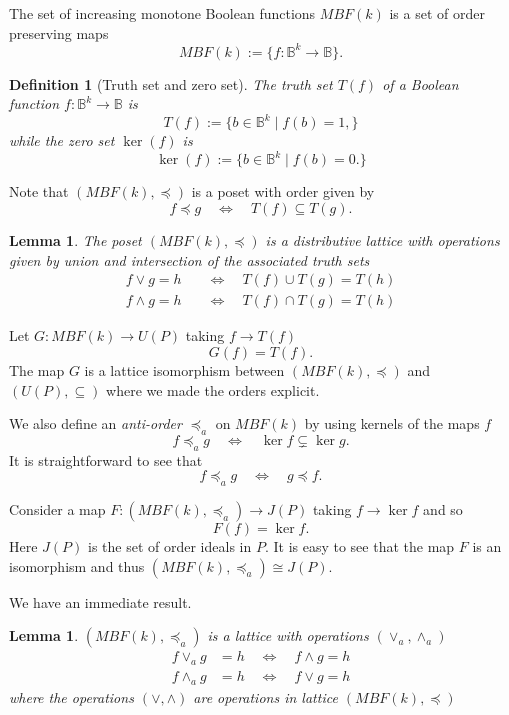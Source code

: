 \documentclass[10pt,letterpaper]{article}
\newcommand{\bbB}{\mathbb{B}}
\newtheorem{lem}[thm]{Lemma}
\newtheorem{defn}[thm]{Definition}
\begin{document}
The set of increasing monotone Boolean functions $MBF(k)$ %
is a set of order preserving maps 
\[ MBF(k):=\{ f:\bbB^k\to \bbB\}. \]


\begin{defn}[Truth set and zero set]
    The \textit{ truth set } $T(f)$ of a Boolean function $f: \bbB^k \to \bbB$ is 
    \[ T(f):=\{ b\in \bbB^k \;|\; f(b) = 1, \}\]
    while the \textit{ zero set } $\ker (f)$ is 
    \[ \ker(f):=\{ b\in \bbB^k \;|\; f(b) = 0. \}\]
\end{defn}

Note that 
$(MBF(k), \preceq)$ is a poset with order given by 
\[ f \preceq g \quad \Leftrightarrow \quad T(f) \subseteq T(g). \]

 \begin{lem}
    The poset $(MBF(k),\preceq)$ is a distributive lattice with operations given by union and intersection of the associated truth sets
    \begin{align*}
         f\vee g = h &\quad \Longleftrightarrow \quad T(f) \cup T(g) = T(h) \\
         f\wedge g = h &\quad \Longleftrightarrow \quad T(f) \cap T(g) = T(h) 
    \end{align*}
 \end{lem}

 Let $G:MBF(k) \to U(P)$ taking $f \to T(f)$
 \[ G(f) = T(f).\]
The map $G$ is a lattice isomorphism between $(MBF(k), \preceq)$ and $(U(P), \subseteq)$ where we made the orders explicit.

We also define an \textit{ anti-order $\preceq_a$} on $MBF(k) $ by using kernels of the maps $f$
\[ f \preceq_a g \quad \Leftrightarrow \quad \ker f \subsetneq \ker g. \]
It is straightforward to see that 
\[ f\preceq_a g \quad \Leftrightarrow \quad g \preceq f.\]

Consider a map $F: (MBF(k),\preceq_a) \to J(P)$ taking $f\to \ker f$ and so 
\[ F(f) = \ker f.\]
Here $J(P)$ is the set of order ideals in $P$. It is easy to see that the map $F$ is an isomorphism and thus $(MBF(k),\preceq_a) \cong J(P)$.

We have an immediate result.
\begin{lem}\label{anti}
    $(MBF(k),\preceq_a)$ is a lattice with operations $(\vee_a, \wedge_a)$
    \begin{align*}
        f \vee_a g &=h \quad \Leftrightarrow \quad f \wedge g =h\\
        f \wedge_a g &=h \quad \Leftrightarrow \quad f \vee g =h
    \end{align*}
    where the operations $(\vee, \wedge)$ are operations in lattice $(MBF(k), \preceq)$
\end{lem}
\end{document}
